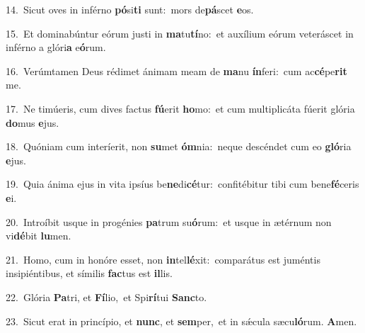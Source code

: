 {\numbfont\textcolor{\numbcolor}{14.}}~Sicut oves in inférno \textbf{pó}\-si\textbf{ti} sunt:~\star mors de\-\textbf{pá}\-scet \textbf{e}\-os.\par
{\numbfont\textcolor{\numbcolor}{15.}}~Et dominabúntur eórum justi in \textbf{ma}\-tu\-\textbf{tí}\-no:~\star et auxílium eórum veteráscet in inférno a glóri\textbf{a} e\-\textbf{ó}\-rum.\par
{\numbfont\textcolor{\numbcolor}{16.}}~Verúmtamen Deus rédimet ánimam meam de \textbf{ma}\-nu \textbf{ín}\-feri:~\star cum ac\-\textbf{cé}\-pe\textbf{rit} me.\par
{\numbfont\textcolor{\numbcolor}{17.}}~Ne timúeris, cum dives factus \textbf{fú}\-erit \textbf{ho}\-mo:~\star et cum multiplicáta fúerit glória \textbf{do}\-mus \textbf{e}\-jus.\par
{\numbfont\textcolor{\numbcolor}{18.}}~Quóniam cum interíerit, non \textbf{su}\-met \textbf{óm}\-nia:~\star neque descéndet cum eo \textbf{gló}\-ria \textbf{e}\-jus.\par
{\numbfont\textcolor{\numbcolor}{19.}}~Quia ánima ejus in vita ipsíus be\-\textbf{ne}\-di\-\textbf{cé}\-tur:~\star confitébitur tibi cum bene\-\textbf{fé}\-ceris \textbf{e}\-i.\par
{\numbfont\textcolor{\numbcolor}{20.}}~Introíbit usque in progénies \textbf{pa}\-trum su\-\textbf{ó}\-rum:~\star et usque in ætérnum non vi\-\textbf{dé}\-bit \textbf{lu}\-men.\par
{\numbfont\textcolor{\numbcolor}{21.}}~Homo, cum in honóre esset, non \textbf{in}\-tel\-\textbf{lé}\-xit:~\star comparátus est juméntis insipiéntibus, et símilis \textbf{fac}\-tus est \textbf{il}\-lis.\par
{\numbfont\textcolor{\numbcolor}{22.}}~Glória \textbf{Pa}\-tri, et \textbf{Fí}\-lio,~\star et Spi\-\textbf{rí}\-tui \textbf{Sanc}\-to.\par
{\numbfont\textcolor{\numbcolor}{23.}}~Sicut erat in princípio, et \textbf{nunc}\-, et \textbf{sem}\-per,~\star et in sǽcula sæcu\-\textbf{ló}\-rum. \textbf{A}\-men.\par
